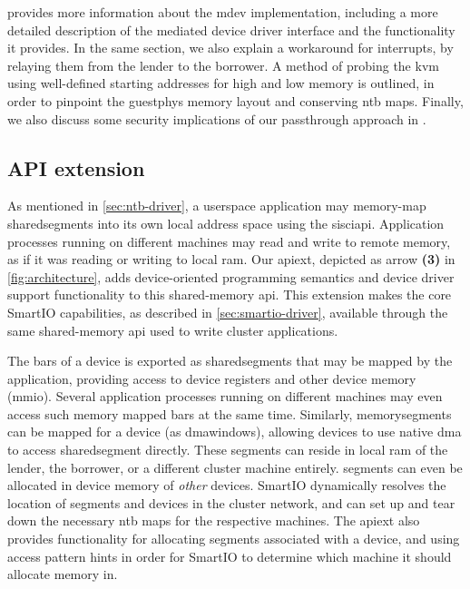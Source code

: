  provides more information about the \gls{mdev} implementation, including a more detailed description of the mediated device driver interface and the functionality it provides. 
%
In the same section, we also explain a workaround for interrupts, by relaying them from the \gls{lender} to the \gls{borrower}.
%
A method of probing the \gls{kvm} using well-defined starting addresses for high and low memory is outlined, in order to pinpoint the \gls{guestphys} memory layout and conserving \gls{ntb} maps.
%
Finally, we also discuss some security implications of our \gls{passthrough} approach in .



\subsection{API extension}\label{sec:api}
As mentioned in \cref{sec:ntb-driver}, a \gls{userspace} application may memory-map \glspl{sharedsegment} into its own local address space using the \gls{sisciapi}.
%
Application processes running on different machines may read and write to remote memory, as if it was reading or writing to local \gls{ram}.
%
Our \gls{apiext}, depicted as arrow \textbf{(3)} in \cref{fig:architecture}, adds device-oriented programming semantics and device driver support functionality to this shared-memory \gls{api}.
%
This extension makes the core SmartIO capabilities, as described in \cref{sec:smartio-driver}, available through the same shared-memory \gls{api} used to write cluster applications.



The \glspl{bar} of a device is exported as \glspl{sharedsegment} that may be mapped by the application, providing access to device registers and other device memory (\gls{mmio}).
%
Several application processes running on different machines may even access such memory mapped \glspl{bar} at the same time.
%
Similarly, \glspl{memorysegment} can be mapped for a device (as \glspl{dmawindow}), allowing devices to use native \gls{dma} to access \gls{sharedsegment} directly.
%
These \glspl{segment} can reside in local \gls{ram} of the \gls{lender}, the \gls{borrower}, or a different cluster machine entirely.
%
\Glspl{segment} can even be allocated in device memory of \emph{other} devices.
%
SmartIO dynamically resolves the location of \glspl{segment} and devices in the cluster network, and can set up and tear down the necessary \gls{ntb} maps for the respective machines.
%
The \gls{apiext} also provides functionality for allocating \glspl{segment} associated with a device, and using access pattern hints in order for SmartIO to determine which machine it should allocate memory in.



